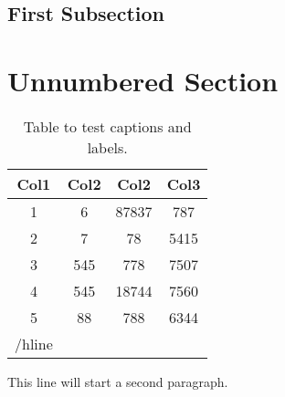 \documentclass[12pt,a4paper]{article}
\begin{document}
\subsection{First Subsection}
\section*{Unnumbered Section}
\begin{table}[h!]
\centering
\begin{tabular}{||c c c c||}
 \hline
 Col1 & Col2 & Col2 & Col3 \\ [0.5ex]
 \hline\hline
 1 & 6 & 87837 & 787 \\
 2 & 7 & 78 & 5415 \\
 3 & 545 & 778 & 7507 \\
 4 & 545 & 18744 & 7560 \\
 5 & 88 & 788 & 6344 \\ [1ex]
/hline
\end{tabular}
\caption{Table to test captions and labels.}
\label{table:data}
\end{table}
This line will start a second paragraph.
\end{document}
